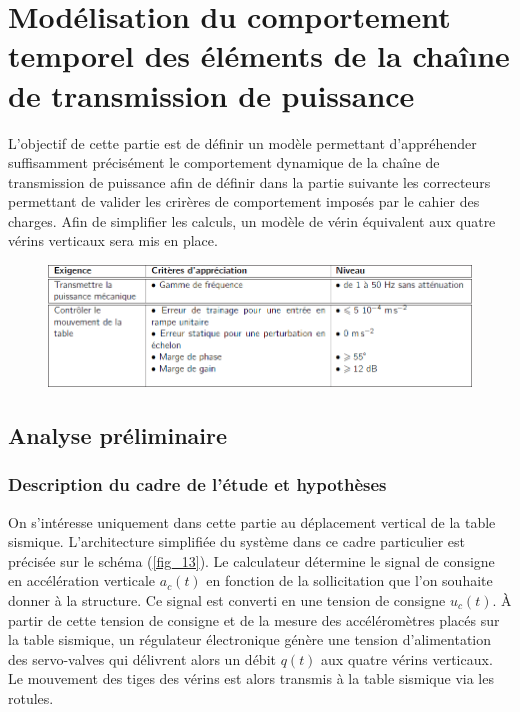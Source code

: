 \documentclass[10pt,fleqn]{article} %
\begin{document}
\section{Modélisation du comportement temporel des éléments de la chaîıne de transmission de puissance}

\begin{obj}
L’objectif de cette partie est de définir un modèle permettant d’appréhender suffisamment
précisément le comportement dynamique de la chaîne de transmission de puissance afin de définir dans la partie
suivante les correcteurs permettant de valider les crirères de comportement imposés par le cahier des charges.
Afin de simplifier les calculs, un modèle de vérin équivalent aux quatre vérins verticaux sera mis en place.
\end{obj}


\begin{figure}[H]
\centering
\includegraphics[width=0.7\linewidth]{req_01}
\end{figure}

\subsection{Analyse préliminaire}

\subsubsection{Description du cadre de l’étude et hypothèses}

On s’intéresse uniquement dans cette partie au déplacement vertical de la table sismique. L’architecture
simplifiée du système dans ce cadre particulier est précisée sur le schéma (\autoref{fig_13}). Le calculateur détermine
le signal de consigne en accélération verticale $a_c (t)$ en fonction de la sollicitation que l’on souhaite donner à
la structure. Ce signal est converti en une tension de consigne $u_c (t)$. À partir de cette tension de consigne et
de la mesure des accéléromètres placés sur la table sismique, un régulateur électronique génère une tension
d’alimentation des servo-valves qui délivrent alors un débit $q(t)$ aux quatre vérins verticaux. Le mouvement des
tiges des vérins est alors transmis à la table sismique via les rotules.
\end{document}
